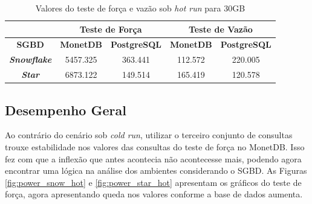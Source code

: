 \begin{table}[htpb]
        \centering
        \caption{Valores do teste de força e vazão sob \textit{hot run} para 30GB}
        \label{tab:forca_vazao_hot_30}
        \begin{tabular}{|c|c|c|c|c|} 
                \cline{2-5}
                \multicolumn{1}{c|}{}         & \multicolumn{2}{c|}{\textbf{Teste de Força} } & \multicolumn{2}{c|}{\textbf{Teste de Vazão} }  \\ 
                \hline
                        \textbf{SGBD}                & \textbf{MonetDB}  & \textbf{PostgreSQL}       & \textbf{MonetDB}  & \textbf{PostgreSQL}        \\ 
                \hline
                        \textit{\textbf{Snowflake}}  & 5457.325          & 363.441                   & 112.572           & 220.005                    \\ 
                \hline
                        \textit{\textbf{Star}}       & 6873.122          & 149.514                   & 165.419           & 120.578                    \\
                \hline
                \end{tabular}
                \end{table}
\subsection{Desempenho Geral}

Ao contrário do cenário sob \textit{cold run}, utilizar o terceiro conjunto de consultas trouxe estabilidade nos valores das consultas do teste de força no MonetDB. Isso fez com que a inflexão que antes acontecia não acontecesse mais, podendo agora encontrar uma lógica na análise dos ambientes considerando o SGBD. As Figuras \ref{fig:power_snow_hot} e \ref{fig:power_star_hot} apresentam os gráficos do teste de força, agora apresentando queda nos valores conforme a base de dados aumenta.

